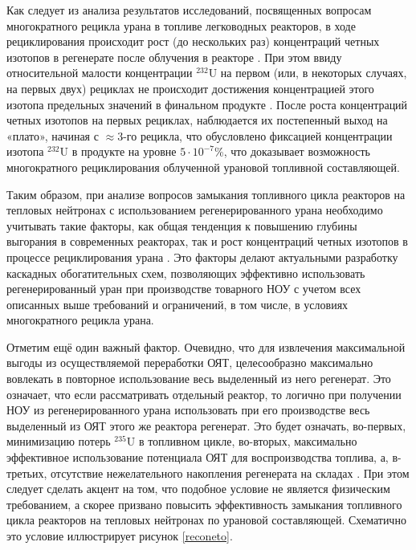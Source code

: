 Как следует из анализа результатов исследований, посвященных вопросам многократного рецикла урана в топливе легководных реакторов, в ходе рециклирования происходит рост (до нескольких раз) концентраций четных изотопов в регенерате после облучения в реакторе \cite{smirnovEvolutionIsotopicComposition2012}. При этом ввиду относительной малости концентрации $^{232}$U на первом (или, в некоторых случаях, на первых двух) рециклах не происходит достижения концентрацией этого изотопа предельных значений в финальном продукте \cite{smirnovApplyingEnrichmentCapacities2018}.
После роста концентраций четных изотопов на первых рециклах, наблюдается их постепенный выход на «плато», начиная с $\approx$3-го рецикла, что обусловлено фиксацией концентрации изотопа $^{232}$U в продукте на уровне $5\cdot10^{-7}$\%, что доказывает возможность многократного рециклирования облученной урановой топливной составляющей.

Таким образом, при анализе вопросов замыкания топливного цикла реакторов на тепловых нейтронах с использованием регенерированного урана необходимо учитывать такие факторы, как общая тенденция к повышению глубины выгорания в современных реакторах, так и рост концентраций четных изотопов в процессе рециклирования урана \cite{andrianovaPovyshenieVygoraniyaTopliva2008}. Это факторы делают актуальными разработку каскадных обогатительных схем, позволяющих эффективно использовать регенерированный уран при производстве товарного НОУ с учетом всех описанных выше требований и ограничений, в том числе, в условиях многократного рецикла урана.

Отметим ещё один важный фактор. Очевидно, что для извлечения максимальной выгоды из осуществляемой переработки ОЯТ, целесообразно максимально вовлекать в повторное использование весь выделенный из него регенерат. Это означает, что если рассматривать отдельный реактор, то логично при получении НОУ из регенерированного урана использовать при его производстве весь выделенный из ОЯТ этого же реактора регенерат. Это будет означать, во-первых, минимизацию потерь $^{235}$U в топливном цикле, во-вторых, максимально эффективное использование потенциала ОЯТ для воспроизводства топлива, а, в-третьих, отсутствие нежелательного накопления регенерата на складах \cite{tendallNuclearEnergyEurope2011}. При этом следует сделать акцент на том, что подобное условие не является физическим требованием, а скорее призвано повысить эффективность замыкания топливного цикла реакторов на тепловых нейтронах по урановой составляющей. Схематично это условие иллюстрирует рисунок \ref{reconeto}.  

